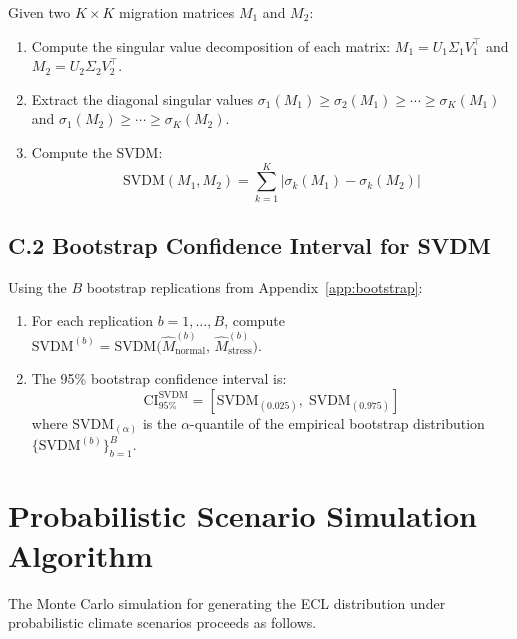 \documentclass[12pt,a4paper]{article}
\begin{document}
Given two $K \times K$ migration matrices $M_1$ and $M_2$:
\begin{enumerate}[noitemsep]
    \item Compute the singular value decomposition of each matrix: $M_1 = U_1 \Sigma_1 V_1^\top$ and $M_2 = U_2 \Sigma_2 V_2^\top$.
    \item Extract the diagonal singular values $\sigma_1(M_1) \geq \sigma_2(M_1) \geq \cdots \geq \sigma_K(M_1)$ and $\sigma_1(M_2) \geq \cdots \geq \sigma_K(M_2)$.
    \item Compute the SVDM:
    \begin{equation}
    \text{SVDM}(M_1, M_2) = \sum_{k=1}^{K} \left|\sigma_k(M_1) - \sigma_k(M_2)\right|
    \end{equation}
\end{enumerate}

\subsection*{C.2 Bootstrap Confidence Interval for SVDM}

Using the $B$ bootstrap replications from Appendix~\ref{app:bootstrap}:
\begin{enumerate}[noitemsep]
    \item For each replication $b = 1, \ldots, B$, compute $\text{SVDM}^{(b)} = \text{SVDM}\bigl(\hat{M}_{\text{normal}}^{(b)},\, \hat{M}_{\text{stress}}^{(b)}\bigr)$.
    \item The 95\% bootstrap confidence interval is:
    \begin{equation}
    \text{CI}_{95\%}^{\text{SVDM}} = \left[\text{SVDM}_{(0.025)},\; \text{SVDM}_{(0.975)}\right]
    \end{equation}
    where $\text{SVDM}_{(\alpha)}$ is the $\alpha$-quantile of the empirical bootstrap distribution $\{\text{SVDM}^{(b)}\}_{b=1}^{B}$.
\end{enumerate}

\section{Probabilistic Scenario Simulation Algorithm}
\label{app:prob_sim}

The Monte Carlo simulation for generating the ECL distribution under probabilistic climate scenarios proceeds as follows.
\end{document}
